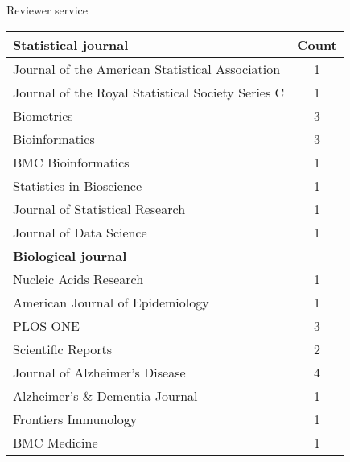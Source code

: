 \documentclass{resume} %
\begin{document}
\begin{rSection}{Reviewer service}

\begin{table}[htp]
\begin{center}
\begin{tabular}{l c }
\hline
\hline
\bf{Statistical journal} & Count \\
\hline
Journal of the American Statistical Association & 1 \\
Journal of the Royal Statistical Society Series C & 1 \\
Biometrics & 3 \\
Bioinformatics & 3 \\
BMC Bioinformatics & 1 \\
Statistics in Bioscience & 1 \\
Journal of Statistical Research & 1 \\
Journal of Data Science & 1 \\
\hline
\hline
\bf{Biological journal} &  \\
\hline
Nucleic Acids Research & 1 \\
American Journal of Epidemiology & 1 \\
PLOS ONE & 3 \\
Scientific Reports & 2 \\
Journal of Alzheimer's Disease & 4 \\
Alzheimer's \& Dementia Journal & 1 \\
Frontiers Immunology & 1 \\
BMC Medicine & 1 \\
\hline
\hline
\end{tabular}
\end{center}
\label{default}
\end{table}%


\end{rSection}
\end{document}
